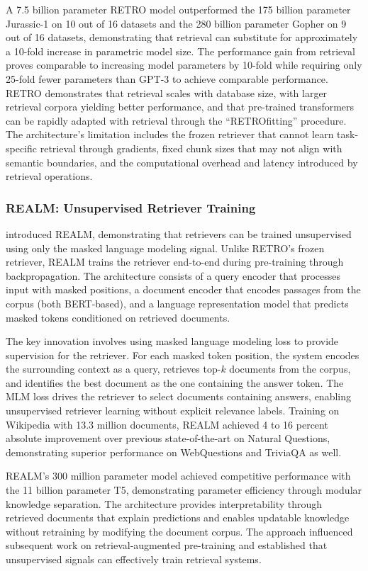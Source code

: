 \documentclass[11pt,letterpaper]{article}
\begin{document}
A 7.5 billion parameter RETRO model outperformed the 175 billion parameter Jurassic-1 on 10 out of 16 datasets and the 280 billion parameter Gopher on 9 out of 16 datasets, demonstrating that retrieval can substitute for approximately a 10-fold increase in parametric model size. The performance gain from retrieval proves comparable to increasing model parameters by 10-fold while requiring only 25-fold fewer parameters than GPT-3 to achieve comparable performance. RETRO demonstrates that retrieval scales with database size, with larger retrieval corpora yielding better performance, and that pre-trained transformers can be rapidly adapted with retrieval through the ``RETROfitting'' procedure. The architecture's limitation includes the frozen retriever that cannot learn task-specific retrieval through gradients, fixed chunk sizes that may not align with semantic boundaries, and the computational overhead and latency introduced by retrieval operations.

\subsubsection{REALM: Unsupervised Retriever Training}

\cite{guu2020realm} introduced REALM, demonstrating that retrievers can be trained unsupervised using only the masked language modeling signal. Unlike RETRO's frozen retriever, REALM trains the retriever end-to-end during pre-training through backpropagation. The architecture consists of a query encoder that processes input with masked positions, a document encoder that encodes passages from the corpus (both BERT-based), and a language representation model that predicts masked tokens conditioned on retrieved documents.

The key innovation involves using masked language modeling loss to provide supervision for the retriever. For each masked token position, the system encodes the surrounding context as a query, retrieves top-$k$ documents from the corpus, and identifies the best document as the one containing the answer token. The MLM loss drives the retriever to select documents containing answers, enabling unsupervised retriever learning without explicit relevance labels. Training on Wikipedia with 13.3 million documents, REALM achieved 4 to 16 percent absolute improvement over previous state-of-the-art on Natural Questions, demonstrating superior performance on WebQuestions and TriviaQA as well.

REALM's 300 million parameter model achieved competitive performance with the 11 billion parameter T5, demonstrating parameter efficiency through modular knowledge separation. The architecture provides interpretability through retrieved documents that explain predictions and enables updatable knowledge without retraining by modifying the document corpus. The approach influenced subsequent work on retrieval-augmented pre-training and established that unsupervised signals can effectively train retrieval systems.
\end{document}
